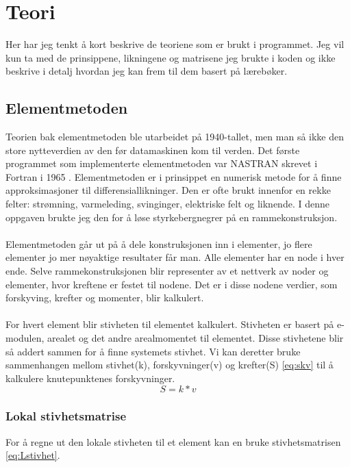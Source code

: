 \documentclass[10pt,a4paper, norsk]{article}
\begin{document}
\section{Teori}

Her har jeg tenkt å kort beskrive de teoriene som er brukt i programmet. Jeg vil kun ta med de prinsippene, likningene og matrisene jeg brukte i koden og ikke beskrive i detalj hvordan jeg kan frem til dem basert på lærebøker. 


\subsection{Elementmetoden}
Teorien bak elementmetoden ble utarbeidet på 1940-tallet, men man så ikke den store nytteverdien av den før datamaskinen kom til verden. Det første programmet som implementerte elementmetoden var NASTRAN skrevet i Fortran i 1965 \cite{wikinastran}.
Elementmetoden er i prinsippet en numerisk metode for å finne approksimasjoner til differensiallikninger. Den er ofte brukt innenfor en rekke felter: strømning, varmeleding, svinginger, elektriske felt og liknende. I denne oppgaven brukte jeg den for å løse styrkebergnegrer på en rammekonstruksjon. 

\paragraph{}
Elementmetoden går ut på å dele konstruksjonen inn i elementer, jo flere elementer jo mer nøyaktige resultater får man. Alle elementer har en node i hver ende. Selve rammekonstruksjonen blir representer av et nettverk av noder og elementer, hvor kreftene er festet til nodene. Det er i disse nodene verdier, som forskyving, krefter og momenter, blir kalkulert.

\paragraph*{}
For hvert element blir stivheten til elementet kalkulert. Stivheten er basert på e-modulen, arealet og det andre arealmomentet til elementet. Disse stivhetene blir så addert sammen for å finne systemets stivhet. Vi kan deretter bruke sammenhangen mellom stivhet(k), forskyvninger(v) og krefter(S) \eqref{eq:skv} til å kalkulere knutepunktenes forskyvninger.
\begin{equation} \label{eq:skv}
S=k*v
\end{equation}

\subsubsection{Lokal stivhetsmatrise}
For å regne ut den lokale stivheten til et element kan en bruke stivhetsmatrisen \eqref{eq:Lstivhet}. 
\end{document}
